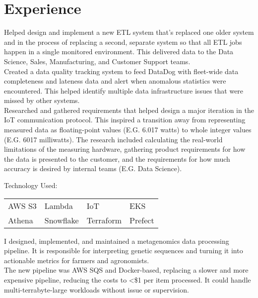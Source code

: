 \documentclass[letterpaper]{deedy-resume} %
\begin{document}
\begin{minipage}[t]{0.66\textwidth} %


\section{Experience}


Helped design and implement a new ETL system that's replaced one older system and in the process of replacing a second, separate system so that all ETL jobs happen in a single monitored environment. This delivered data to the Data Science, Sales, Manufacturing, and Customer Support teams. \\[1em]
Created a data quality tracking system to feed DataDog with fleet-wide data completeness and lateness data and alert when anomalous statistics were encountered. This helped identify multiple data infrastructure issues that were missed by other systems.\\[1em]
Researched and gathered requirements that helped design a major iteration in the IoT communication protocol. This inspired a transition away from representing measured data as floating-point values (E.G. 6.017 watts) to whole integer values (E.G. 6017 milliwatts). The research included calculating the real-world limitations of the measuring hardware, gathering product requirements for how the data is presented to the customer, and the requirements for how much accuracy is desired by internal teams (E.G. Data Science).
\sectionspace

Technology Used:\\
\begin{tabular}{llll}
AWS S3 & Lambda & IoT & EKS\\
Athena & Snowflake & Terraform & Prefect\\
\end{tabular}

\sectionspace %


I designed, implemented, and maintained a metagenomics data processing pipeline. It is responsible for interpreting genetic sequences and turning it into actionable metrics for farmers and agronomists.\\[1em]
The new pipeline was AWS SQS and Docker-based, replacing a slower and more expensive pipeline, reducing the costs to <\$1 per item processed. It could handle multi-terrabyte-large workloads without issue or supervision.
\sectionspace


\end{minipage}
\end{document}
